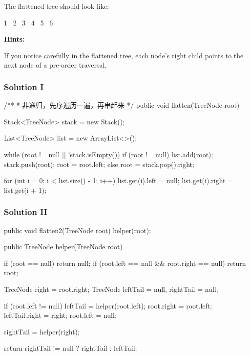 The flattened tree should look like:
\begin{Code}
   1
    \
     2
      \
       3
        \
         4
          \
           5
            \
             6
\end{Code}

\textbf{Hints:}

If you notice carefully in the flattened tree, each node's right child points to the next node of a pre-order traversal.

\subsubsection{Solution I}

\begin{Code}
/**
 * 非递归，先序遍历一遍，再串起来
 */
public void flatten(TreeNode root) {
    Stack<TreeNode> stack = new Stack();

    List<TreeNode> list = new ArrayList<>();

    while (root != null || !stack.isEmpty()) {
        if (root != null) {
            list.add(root);
            stack.push(root);
            root = root.left;
        } else {
            root = stack.pop().right;
        }
    }

    for (int i = 0; i < list.size() - 1; i++) {
        list.get(i).left = null;
        list.get(i).right = list.get(i + 1);
    }
}
\end{Code}

\subsubsection{Solution II}

\begin{Code}
public void flatten2(TreeNode root) {
    helper(root);
}

public TreeNode helper(TreeNode root) {
    if (root == null) {
        return null;
    }
    if (root.left == null && root.right == null) {
        return root;
    }

    TreeNode right = root.right;
    TreeNode leftTail = null, rightTail = null;

    if (root.left != null) {
        leftTail = helper(root.left);
        root.right = root.left;
        leftTail.right = right;
        root.left = null;
    }

    rightTail = helper(right);

    return rightTail != null ? rightTail : leftTail;
}
\end{Code}

